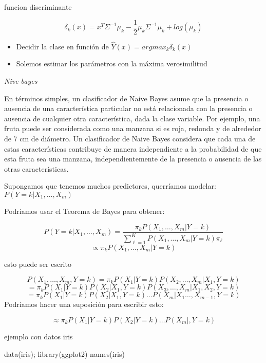 \documentclass[
]{article}
\newenvironment{Shaded}{\begin{snugshade}}{\end{snugshade}}
\newcommand{\FunctionTok}[1]{\textcolor[rgb]{0.00,0.00,0.00}{#1}}
\newcommand{\NormalTok}[1]{#1}
\providecommand{\tightlist}{%
  \setlength{\itemsep}{0pt}\setlength{\parskip}{0pt}}
\begin{document}
funcion discriminante

\[\delta_k(x) = x^T \Sigma^{-1} \mu_k - \frac{1}{2}\mu_k \Sigma^{-1}\mu_k + log(\mu_k)\]

\begin{itemize}
\tightlist
\item
  Decidir la clase en función de
  \(\hat {Y} (x) = argmax_k \delta_k (x)\)
\item
  Solemos estimar los parámetros con la máxima verosimilitud
\end{itemize}

\emph{Nive bayes}

En términos simples, un clasificador de Naive Bayes asume que la
presencia o ausencia de una característica particular no está
relacionada con la presencia o ausencia de cualquier otra
característica, dada la clase variable. Por ejemplo, una fruta puede ser
considerada como una manzana si es roja, redonda y de alrededor de 7 cm
de diámetro. Un clasificador de Naive Bayes considera que cada una de
estas características contribuye de manera independiente a la
probabilidad de que esta fruta sea una manzana, independientemente de la
presencia o ausencia de las otras características.

Supongamos que tenemos muchos predictores, querríamos modelar:
\(P (Y = k | X_1, \ldots, X_m)\)

Podríamos usar el Teorema de Bayes para obtener:

\[P(Y = k | X_1,\ldots,X_m) = \frac{\pi_k P(X_1,\ldots,X_m| Y=k)}{\sum_{\ell = 1}^K P(X_1,\ldots,X_m | Y=k) \pi_{\ell}}\]
\[\propto \pi_k P(X_1,\ldots,X_m| Y=k)\]

esto puede ser escrito

\[P(X_1,\ldots,X_m, Y=k) = \pi_k P(X_1 | Y = k)P(X_2,\ldots,X_m | X_1,Y=k)\]
\[= \pi_k P(X_1 | Y = k) P(X_2 | X_1, Y=k) P(X_3,\ldots,X_m | X_1,X_2, Y=k)\]
\[= \pi_k P(X_1 | Y = k) P(X_2 | X_1, Y=k)\ldots P(X_m|X_1\ldots,X_{m-1},Y=k)\]
Podríamos hacer una suposición para escribir esto:

\[\approx \pi_k P(X_1 | Y = k) P(X_2 | Y = k)\ldots P(X_m |,Y=k)\]

ejemplo con datos iris

\begin{Shaded}
\begin{Highlighting}[]
\FunctionTok{data}\NormalTok{(iris); }\FunctionTok{library}\NormalTok{(ggplot2)}
\FunctionTok{names}\NormalTok{(iris)}
\end{Highlighting}
\end{Shaded}
\end{document}
